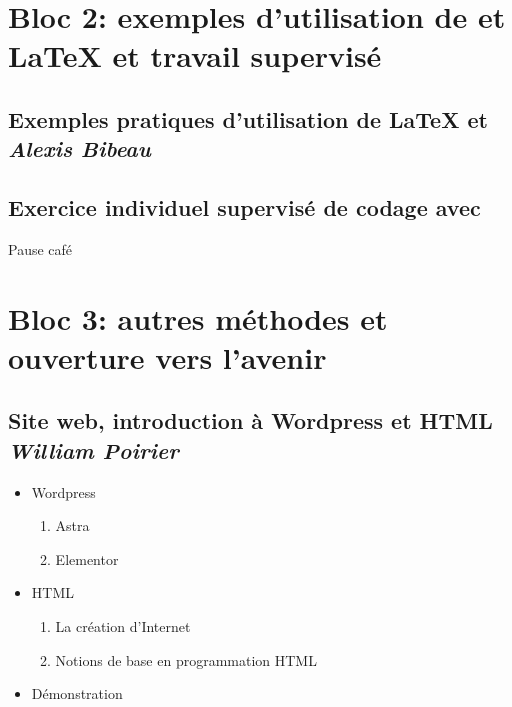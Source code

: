 \documentclass{beamer}
\begin{document}
\section{Bloc 2: exemples d’utilisation de \R et \LaTeX{} et travail supervisé}
\subsection{Exemples pratiques d’utilisation de \LaTeX{} et \R \\ \small\emph{Alexis Bibeau}}

\subsection{Exercice individuel supervisé de codage avec \R}



\begin{frame}
\begin{recipe}
\begin{center}
\Huge Pause café
\end{center}
\end{recipe}
\end{frame}


\section{Bloc 3: autres méthodes et ouverture vers l’avenir}
\subsection{Site web, introduction à Wordpress et HTML \\ \small\emph{William Poirier}}


\begin{frame}
        \begin{itemize}
            \item Wordpress
                      \begin{enumerate}
                        \item Astra
                        \item Elementor
                      \end{enumerate}
            \item<2-> HTML
                      \begin{enumerate} 
                        \item La création d'Internet
                        \item Notions de base en programmation HTML
                      \end{enumerate}
            \item<3-> Démonstration
        \end{itemize}
    \end{frame}
    
\end{document}

